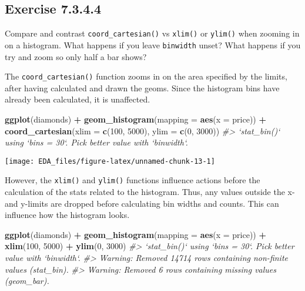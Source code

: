 \documentclass[]{book}
\newenvironment{Shaded}{\begin{snugshade}}{\end{snugshade}}
\newcommand{\CommentTok}[1]{\textcolor[rgb]{0.56,0.35,0.01}{\textit{#1}}}
\newcommand{\DataTypeTok}[1]{\textcolor[rgb]{0.13,0.29,0.53}{#1}}
\newcommand{\DecValTok}[1]{\textcolor[rgb]{0.00,0.00,0.81}{#1}}
\newcommand{\KeywordTok}[1]{\textcolor[rgb]{0.13,0.29,0.53}{\textbf{#1}}}
\newcommand{\NormalTok}[1]{#1}
\newcommand{\OperatorTok}[1]{\textcolor[rgb]{0.81,0.36,0.00}{\textbf{#1}}}
\newcommand{\StringTok}[1]{\textcolor[rgb]{0.31,0.60,0.02}{#1}}
\theoremstyle{plain}
\theoremstyle{remark}
\begin{document}
\hypertarget{exercise-7.3.4.4}{%
\subsection*{\texorpdfstring{Exercise
{7.3.4.4}}{Exercise 7.3.4.4}}\label{exercise-7.3.4.4}}

Compare and contrast \texttt{coord\_cartesian()} vs \texttt{xlim()} or
\texttt{ylim()} when zooming in on a histogram. What happens if you
leave \texttt{binwidth} unset? What happens if you try and zoom so only
half a bar shows?

The \texttt{coord\_cartesian()} function zooms in on the area specified
by the limits, after having calculated and drawn the geoms. Since the
histogram bins have already been calculated, it is unaffected.

\begin{Shaded}
\begin{Highlighting}[]
\KeywordTok{ggplot}\NormalTok{(diamonds) }\OperatorTok{+}
\StringTok{  }\KeywordTok{geom_histogram}\NormalTok{(}\DataTypeTok{mapping =} \KeywordTok{aes}\NormalTok{(}\DataTypeTok{x =}\NormalTok{ price)) }\OperatorTok{+}
\StringTok{  }\KeywordTok{coord_cartesian}\NormalTok{(}\DataTypeTok{xlim =} \KeywordTok{c}\NormalTok{(}\DecValTok{100}\NormalTok{, }\DecValTok{5000}\NormalTok{), }\DataTypeTok{ylim =} \KeywordTok{c}\NormalTok{(}\DecValTok{0}\NormalTok{, }\DecValTok{3000}\NormalTok{))}
\CommentTok{#> `stat_bin()` using `bins = 30`. Pick better value with `binwidth`.}
\end{Highlighting}
\end{Shaded}

\begin{center}\texttt{[image: EDA\_files/figure-latex/unnamed-chunk-13-1]} \end{center}

However, the \texttt{xlim()} and \texttt{ylim()} functions influence
actions before the calculation of the stats related to the histogram.
Thus, any values outside the x- and y-limits are dropped before
calculating bin widths and counts. This can influence how the histogram
looks.

\begin{Shaded}
\begin{Highlighting}[]
\KeywordTok{ggplot}\NormalTok{(diamonds) }\OperatorTok{+}
\StringTok{  }\KeywordTok{geom_histogram}\NormalTok{(}\DataTypeTok{mapping =} \KeywordTok{aes}\NormalTok{(}\DataTypeTok{x =}\NormalTok{ price)) }\OperatorTok{+}
\StringTok{  }\KeywordTok{xlim}\NormalTok{(}\DecValTok{100}\NormalTok{, }\DecValTok{5000}\NormalTok{) }\OperatorTok{+}
\StringTok{  }\KeywordTok{ylim}\NormalTok{(}\DecValTok{0}\NormalTok{, }\DecValTok{3000}\NormalTok{)}
\CommentTok{#> `stat_bin()` using `bins = 30`. Pick better value with `binwidth`.}
\CommentTok{#> Warning: Removed 14714 rows containing non-finite values (stat_bin).}
\CommentTok{#> Warning: Removed 6 rows containing missing values (geom_bar).}
\end{Highlighting}
\end{Shaded}
\end{document}
